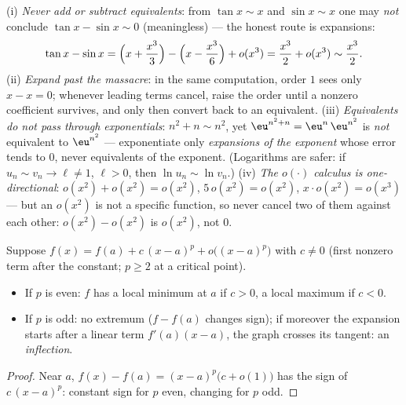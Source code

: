 \begin{remark}
(i) \emph{Never add or subtract equivalents}: from $\tan x \sim
x$ and $\sin x \sim x$ one may \emph{not} conclude $\tan x -
\sin x \sim 0$ (meaningless) --- the honest route is
expansions:
\[
\tan x - \sin x
= \Bigl(x + \frac{x^3}{3}\Bigr) - \Bigl(x - \frac{x^3}{6}\Bigr)
+ o(x^3) = \frac{x^3}{2} + o(x^3) \sim \frac{x^3}{2} .
\]
(ii) \emph{Expand past the massacre}: in the same computation,
order $1$ sees only $x - x = 0$; whenever leading terms cancel,
raise the order until a nonzero coefficient survives, and only
then convert back to an equivalent. (iii) \emph{Equivalents do
not pass through exponentials}: $n^2 + n \sim n^2$, yet
$\eu^{n^2+n} = \eu^{n}\,\eu^{n^2}$ is \emph{not} equivalent to
$\eu^{n^2}$ --- exponentiate only \emph{expansions of the
exponent} whose error tends to $0$, never equivalents of the
exponent. (Logarithms are safer: if $u_n \sim v_n \to \ell \neq
1$, $\ell > 0$, then $\ln u_n \sim \ln v_n$.) (iv) \emph{The
$o(\cdot)$ calculus is one-directional}: $o(x^2) + o(x^2) =
o(x^2)$, $5\,o(x^2) = o(x^2)$, $x\cdot o(x^2) = o(x^3)$ --- but
an $o(x^2)$ is not a specific function, so never cancel two of
them against each other: $o(x^2) - o(x^2)$ is $o(x^2)$, not
$0$.
\end{remark}

\begin{proposition}\label{prop:b1:taylor:local}
Suppose $f(x) = f(a) + c\,(x - a)^p + o\bigl((x-a)^p\bigr)$ with $c
\neq 0$ (first nonzero term after the constant; $p \geq 2$ at a
critical point).
\begin{itemize}
  \item If $p$ is even: $f$ has a local minimum at $a$ if $c > 0$, a
        local maximum if $c < 0$.
  \item If $p$ is odd: no extremum ($f - f(a)$ changes sign);
        if moreover the expansion starts after a linear term $f'(a)(x
        - a)$, the graph crosses its tangent: an \emph{inflection}.
\end{itemize}
\end{proposition}

\begin{proof}
Near $a$, $f(x) - f(a) = (x-a)^p\bigl(c + o(1)\bigr)$ has the sign
of $c\,(x-a)^p$: constant sign for $p$ even, changing for $p$ odd.
\end{proof}

